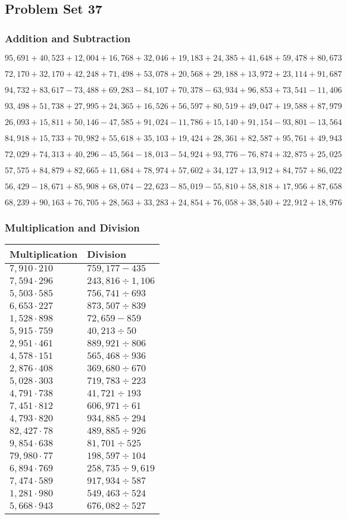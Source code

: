 \hypertarget{problem-set-37-4}{%
\subsection{Problem Set 37}\label{problem-set-37-4}}

\hypertarget{addition-and-subtraction-259}{%
\subsubsection{Addition and
Subtraction}\label{addition-and-subtraction-259}}

\(95,691+40,523+12,004+16,768+32,046+19,183+24,385+41,648+59,478+ 80,673\)

\(72,170+32,170+42,248+71,498+53,078+20,568+29,188+13,972+23,114+91,687\)

\(94,732+83,617-73,488+69,283-84,107+70,378-63,934+96,853+73,541-11,406\)

\(93,498+51,738+27,995+24,365+16,526+56,597+80,519+49,047+19,588+87,979\)

\(26,093+15,811+50,146-47,585+91,024-11,786+15,140+91,154-93,801-13,564\)

\(84,918+15,733+70,982+55,618+35,103+19,424+28,361+82,587+95,761+49,943\)

\(72,029+74,313+40,296-45,564-18,013-54,924+93,776-76,874+32,875+25,025\)

\(57,575+84,879+82,665+11,684+78,974+57,602+34,127+13,912+84,757+86,022\)

\(56,429-18,671+85,908+68,074-22,623-85,019-55,810+58,818+17,956+87,658\)

\(68,239+90,163+76,705+28,563+33,283+24,854+76,058+38,540+22,912+18,976\)

\hypertarget{multiplication-and-division-258}{%
\subsubsection{Multiplication and
Division}\label{multiplication-and-division-258}}

\begin{longtable}[]{@{}ll@{}}
\toprule
Multiplication & Division\tabularnewline
\midrule
\endhead
\(7,910\cdot210\) & \(759,177 - 435\)\tabularnewline
\(7,594\cdot296\) & \(243,816÷1,106\)\tabularnewline
\(5,503\cdot585\) & \(756,741÷693\)\tabularnewline
\(6,653\cdot227\) & \(873,507÷839\)\tabularnewline
\(1,528\cdot898\) & \(72,659 - 859\)\tabularnewline
\(5,915\cdot759\) & \(40,213÷50\)\tabularnewline
\(2,951\cdot461\) & \(889,921÷806\)\tabularnewline
\(4,578\cdot151\) & \(565,468÷936\)\tabularnewline
\(2,876\cdot408\) & \(369,680÷670\)\tabularnewline
\(5,028\cdot303\) & \(719,783÷223\)\tabularnewline
\(4,791\cdot738\) & \(41,721÷193\)\tabularnewline
\(7,451\cdot812\) & \(606,971÷61\)\tabularnewline
\(4,793\cdot820\) & \(934,885÷294\)\tabularnewline
\(82,427\cdot78\) & \(489,885÷926\)\tabularnewline
\(9,854\cdot638\) & \(81,701÷525\)\tabularnewline
\(79,980\cdot77\) & \(198,597÷104\)\tabularnewline
\(6,894\cdot769\) & \(258,735÷9,619\)\tabularnewline
\(7,474\cdot589\) & \(917,934÷587\)\tabularnewline
\(1,281\cdot980\) & \(549,463÷524\)\tabularnewline
\(5,668\cdot943\) & \(676,082÷527\)\tabularnewline
\bottomrule
\end{longtable}

